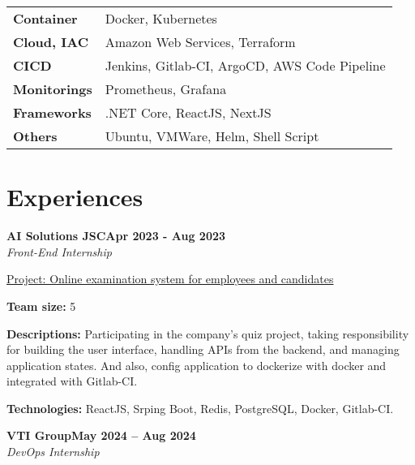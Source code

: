 \documentclass[letterpaper,10pt]{article}
\newcommand{\heading}[2]{
  \hspace{10pt}#1\hfill#2\\
}
\newcommand{\headingBf}[2]{
  \heading{\textbf{#1}}{\textbf{#2}}
}
\newcommand{\headingIt}[2]{
  \heading{\textit{#1}}{\textit{#2}}
}
\newenvironment{resume_list}{
  \vspace{-7pt}
  \begin{itemize}[itemsep=-2px, parsep=1pt, leftmargin=30pt]
}{
  \end{itemize}
}
\newcommand{\itemTitle}[1]{
  \item[] \underline{#1}\vspace{4pt}
}
\begin{document}
\begin{tabularx}{\textwidth}{@{} l X @{}}
\textbf{Container} & \hspace{10pt} Docker, Kubernetes \\[8pt] %
\textbf{Cloud, IAC} & \hspace{10pt} Amazon Web Services, Terraform \\[8pt] %
\textbf{CICD} & \hspace{10pt} Jenkins, Gitlab-CI, ArgoCD, AWS Code Pipeline \\[8pt] %
\textbf{Monitorings} & \hspace{10pt} Prometheus, Grafana \\[8pt] %
\textbf{Frameworks} & \hspace{10pt} .NET Core, ReactJS, NextJS \\[8pt] %
\textbf{Others} & \hspace{10pt} Ubuntu, VMWare, Helm, Shell Script \\
\end{tabularx}




\section{Experiences}

\headingBf{AI Solutions JSC}{Apr 2023 - Aug 2023}
\headingIt{Front-End Internship}{}

\begin{resume_list}
    \itemTitle{Project: Online examination system for employees and candidates}
    \item \textbf{Team size:} 5
    \item \textbf{Descriptions:} Participating in the company's quiz project, taking responsibility for building the user interface, handling APIs from the backend, and managing application states. And also, config application to dockerize with docker and integrated with Gitlab-CI.
    \item \textbf{Technologies:} ReactJS, Srping Boot, Redis, PostgreSQL, Docker, Gitlab-CI.
\end{resume_list}



\headingBf{VTI Group}{May 2024 -- Aug 2024}
\headingIt{DevOps Internship}{}
\end{document}

